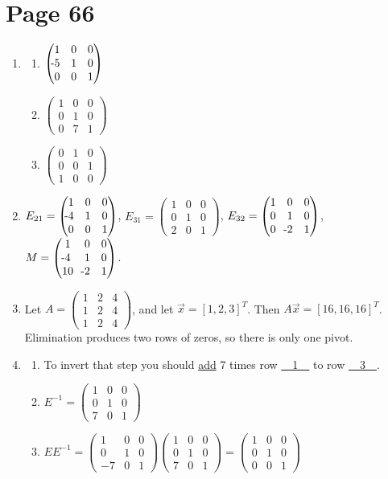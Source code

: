 \documentclass[11pt,twoside]{article}
\newcommand{\bpm}{\begin{pmatrix}}
\newcommand{\epm}{\end{pmatrix}}
\newcommand{\mn}{\llap{-}}
\begin{document}
\section*{Page 66}
\begin{enumerate}
  \item[1.] \begin{enumerate}
    \item $\bpm 1 & 0 & 0 \\ \mn5 & 1 & 0 \\ 0 & 0 & 1\epm$
    \item $\bpm 1 & 0 & 0 \\ 0 & 1 & 0 \\ 0 & 7 & 1\epm$
    \item $\bpm 0 & 1 & 0 \\ 0 & 0 & 1 \\ 1 & 0 & 0\epm$
  \end{enumerate} 
  
  \item[3.] $E_{21}=\bpm 1 & 0 & 0 \\ \mn4 & 1 & 0 \\ 0 & 0 & 1\epm$, $E_{31}=\bpm 1 & 0 & 0 \\ 0 & 1 & 0 \\ 2 & 0 & 1\epm$, $E_{32}=\bpm 1 & 0 & 0 \\ 0 & 1 & 0 \\ 0 & \mn2 & 1\epm$, $M=\bpm 1 & 0 & 0 \\ \mn4 & 1 & 0 \\ 10 & \mn2 & 1\epm$.
  
  \item[6.] Let $A=\bpm 1 & 2 & 4 \\ 1 & 2 & 4 \\ 1 & 2 & 4 \epm$, and let $\vec{x}=[1,2,3]^T$. Then $A\vec{x}=[16,16,16]^T$. Elimination produces two rows of zeros, so there is only one pivot.
  
  \item[7.] \begin{enumerate}
    \item To invert that step you should \underline{add} 7 times row \underline{~~1~~} to row \underline{~~3~~}.
    \item $E^{-1}=\bpm 1 & 0 & 0 \\ 0 & 1 & 0 \\ 7 & 0 & 1\epm$
    \item $EE^{-1}=\bpm 1 & 0 & 0 \\ 0 & 1 & 0 \\ -7 & 0 & 1\epm\bpm 1 & 0 & 0 \\ 0 & 1 & 0 \\ 7 & 0 & 1\epm = \bpm 1 & 0 & 0 \\ 0 & 1 & 0 \\ 0 & 0 & 1\epm$
  \end{enumerate}
  

\end{enumerate}
\end{document}

